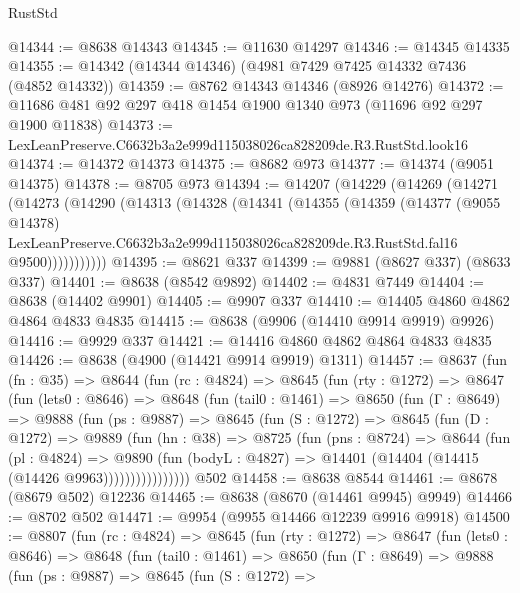 \begin{lexlean}{RustStd}
\begin{coremodule}
@14344 := @8638 @14343
@14345 := @11630 @14297
@14346 := @14345 @14335
@14355 := @14342 (@14344 @14346) (@4981 @7429 @7425 @14332 @7436 (@4852 @14332))
@14359 := @8762 @14343 @14346 (@8926 @14276)
@14372 := @11686 @481 @92 @297 @418 @1454 @1900 @1340 @973 (@11696 @92 @297 @1900 @11838)
@14373 := LexLeanPreserve.C6632b3a2e999d115038026ca828209de.R3.RustStd.look16
@14374 := @14372 @14373
@14375 := @8682 @973
@14377 := @14374 (@9051 @14375)
@14378 := @8705 @973
@14394 := @14207
    (@14229
      (@14269
        (@14271
          (@14273
            (@14290
              (@14313
                (@14328
                  (@14341
                    (@14355
                      (@14359
                        (@14377
                          (@9055 @14378)
                          LexLeanPreserve.C6632b3a2e999d115038026ca828209de.R3.RustStd.fal16
                          @9500)))))))))))
@14395 := @8621 @337
@14399 := @9881 (@8627 @337) (@8633 @337)
@14401 := @8638 (@8542 @9892)
@14402 := @4831 @7449
@14404 := @8638 (@14402 @9901)
@14405 := @9907 @337
@14410 := @14405 @4860 @4862 @4864 @4833 @4835
@14415 := @8638 (@9906 (@14410 @9914 @9919) @9926)
@14416 := @9929 @337
@14421 := @14416 @4860 @4862 @4864 @4833 @4835
@14426 := @8638 (@4900 (@14421 @9914 @9919) @1311)
@14457 := @8637
    (fun (fn : @35) =>
    @8644
      (fun (rc : @4824) =>
      @8645
        (fun (rty : @1272) =>
        @8647
          (fun (lets0 : @8646) =>
          @8648
            (fun (tail0 : @1461) =>
            @8650
              (fun (Γ : @8649) =>
              @9888
                (fun (ps : @9887) =>
                @8645
                  (fun (S : @1272) =>
                  @8645
                    (fun (D : @1272) =>
                    @9889
                      (fun (hn : @38) =>
                      @8725
                        (fun (pns : @8724) =>
                        @8644
                          (fun (pl : @4824) =>
                          @9890
                            (fun (bodyL : @4827) =>
                            @14401 (@14404 (@14415 (@14426 @9963))))))))))))))))
    @502
@14458 := @8638 @8544
@14461 := @8678 (@8679 @502) @12236
@14465 := @8638 (@8670 (@14461 @9945) @9949)
@14466 := @8702 @502
@14471 := @9954 (@9955 @14466 @12239 @9916 @9918)
@14500 := @8807
    (fun (rc : @4824) =>
    @8645
      (fun (rty : @1272) =>
      @8647
        (fun (lets0 : @8646) =>
        @8648
          (fun (tail0 : @1461) =>
          @8650
            (fun (Γ : @8649) =>
            @9888
              (fun (ps : @9887) =>
              @8645
                (fun (S : @1272) =>

\end{coremodule}
\end{lexlean}
